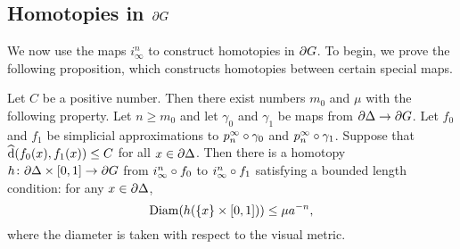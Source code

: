 \documentclass[a4paper]{article}
\begin{document}
\subsection{Homotopies in $\partial G$}

We now use the maps $i^n_\infty$ to construct homotopies in $\partial G$. To
begin, we prove the following proposition, which constructs homotopies between
certain special maps.

\begin{proposition}\label{prop:basic_homotopies}
  Let $C$ be a positive number. Then there exist numbers $m_0$ and $\mu$
  with the following property. Let $n \geq m_0$ and let $\gamma_0$ and
  $\gamma_1$ be maps from $\partial\Delta\to\partial G$. Let $f_0$ and $f_1$
  be simplicial approximations to $p^\infty_n\circ \gamma_0$ and
  $p^\infty_n\circ\gamma_1$. Suppose that $\operatorname{\widehat{d}}(f_0(x), f_1(x))\leq C$
  for all $x \in \partial \Delta$. Then there is a homotopy
  $h\colon\partial\Delta\times[0,1]\to\partial G$ from $i^n_\infty\circ
  f_0$ to $i^n_\infty\circ f_1$ satisfying a bounded length condition: for
  any $x \in \partial\Delta$,
  \begin{equation*}
    \operatorname{Diam}(h(\{x\} \times [0,1])) \leq \mu a^{-n},
  \end{equation*}
  where the diameter is taken with respect to the visual metric.
\end{proposition}
\end{document}
